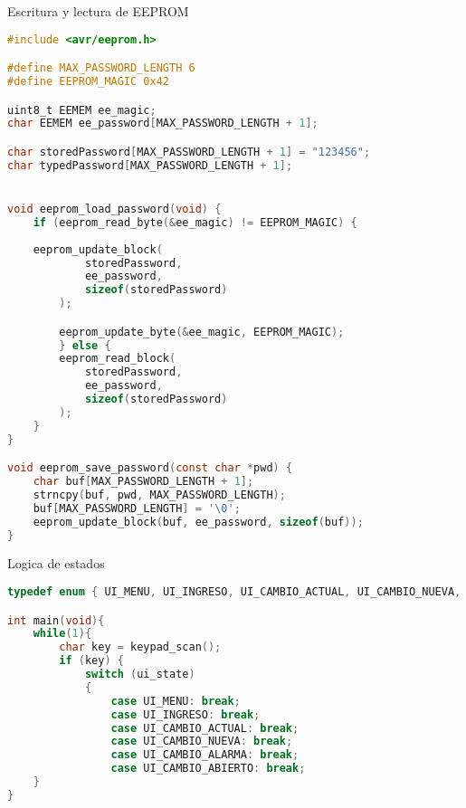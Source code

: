 Escritura y lectura de EEPROM
\begin{lstlisting}[language=C, caption={Escritura y lectura de EEPROM}]
#include <avr/eeprom.h>

#define MAX_PASSWORD_LENGTH 6
#define EEPROM_MAGIC 0x42

uint8_t EEMEM ee_magic;                
char EEMEM ee_password[MAX_PASSWORD_LENGTH + 1];

char storedPassword[MAX_PASSWORD_LENGTH + 1] = "123456";
char typedPassword[MAX_PASSWORD_LENGTH + 1];


void eeprom_load_password(void) {
	if (eeprom_read_byte(&ee_magic) != EEPROM_MAGIC) {
		
	eeprom_update_block(
			storedPassword, 
			ee_password, 
			sizeof(storedPassword)
		);

		eeprom_update_byte(&ee_magic, EEPROM_MAGIC);
		} else {
		eeprom_read_block(
			storedPassword, 
			ee_password, 
			sizeof(storedPassword)
		);
	}
}

void eeprom_save_password(const char *pwd) {
	char buf[MAX_PASSWORD_LENGTH + 1];
	strncpy(buf, pwd, MAX_PASSWORD_LENGTH);
	buf[MAX_PASSWORD_LENGTH] = '\0';
	eeprom_update_block(buf, ee_password, sizeof(buf));
}
\end{lstlisting}


Logica de estados
\begin{lstlisting}[language=C, caption={Logica de estados}]
typedef enum { UI_MENU, UI_INGRESO, UI_CAMBIO_ACTUAL, UI_CAMBIO_NUEVA, UI_ABIERTO, UI_ALARMA } ui_state_t;

int main(void){
    while(1){
        char key = keypad_scan();
		if (key) {
			switch (ui_state)
			{
                case UI_MENU: break;
                case UI_INGRESO: break;
                case UI_CAMBIO_ACTUAL: break;
                case UI_CAMBIO_NUEVA: break;
                case UI_CAMBIO_ALARMA: break;
                case UI_CAMBIO_ABIERTO: break;
    }
}
\end{lstlisting}

